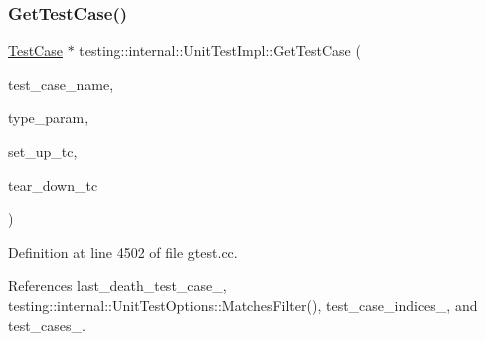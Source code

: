 \subsubsection{\texorpdfstring{Get\+Test\+Case()}{GetTestCase()}\hspace{0.1cm}{\footnotesize\ttfamily [2/2]}}
{\footnotesize\ttfamily \hyperlink{classtesting_1_1TestCase}{Test\+Case} $\ast$ testing\+::internal\+::\+Unit\+Test\+Impl\+::\+Get\+Test\+Case (\begin{DoxyParamCaption}\item[{const char $\ast$}]{test\+\_\+case\+\_\+name,  }\item[{const char $\ast$}]{type\+\_\+param,  }\item[{\hyperlink{classtesting_1_1Test_a5f2a051d1d99c9b784c666c586186cf9}{Test\+::\+Set\+Up\+Test\+Case\+Func}}]{set\+\_\+up\+\_\+tc,  }\item[{\hyperlink{classtesting_1_1Test_aa0f532e93b9f3500144c53f31466976c}{Test\+::\+Tear\+Down\+Test\+Case\+Func}}]{tear\+\_\+down\+\_\+tc }\end{DoxyParamCaption})}



Definition at line 4502 of file gtest.\+cc.



References last\+\_\+death\+\_\+test\+\_\+case\+\_\+, testing\+::internal\+::\+Unit\+Test\+Options\+::\+Matches\+Filter(), test\+\_\+case\+\_\+indices\+\_\+, and test\+\_\+cases\+\_\+.


